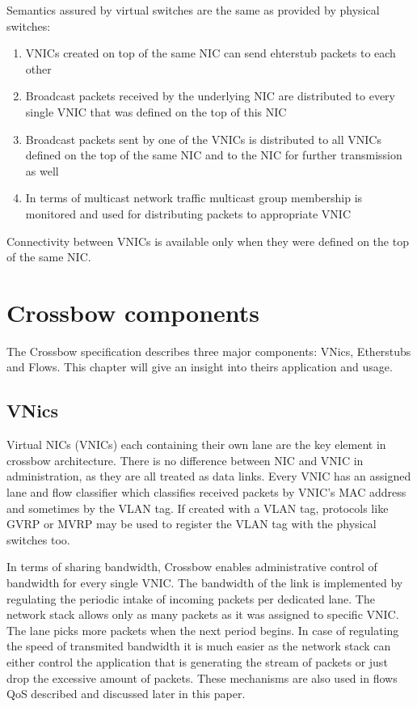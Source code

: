\documentclass[11pt]{book}
\begin{document}
			Semantics assured by virtual switches are the same as provided by physical switches: 
			\begin{enumerate}
				\item{VNICs created on top of the same NIC can send ehterstub packets to each other}
				\item{Broadcast packets received by the underlying NIC are distributed to every single VNIC that was defined on the top of this NIC}
				\item{Broadcast packets sent by one of the VNICs is distributed to all VNICs defined on the top of the same NIC and to the NIC for further transmission as well}
				\item{In terms of multicast network traffic multicast group membership is monitored and used for distributing packets to appropriate VNIC}
			\end{enumerate}

			Connectivity between VNICs is available only when they were defined on the top of the same NIC. 

		
	\section{Crossbow components}

                The Crossbow specification describes three major components: VNics, Etherstubs and Flows. This chapter will give an insight into theirs application and usage. 

		\subsection{VNics}
			Virtual NICs (VNICs) each containing their own lane are the key element in crossbow architecture. There is no
			difference between NIC and VNIC in administration, as they are all treated as data links. Every VNIC has an assigned
			lane and flow classifier which classifies received packets by VNIC's MAC address and sometimes by the VLAN tag.
			If created with a VLAN tag, protocols like GVRP or MVRP may be used to register the VLAN tag with the physical switches
			too.	

			In terms of sharing bandwidth, Crossbow enables administrative control of bandwidth for every single VNIC. The bandwidth of the link
			is implemented by regulating the periodic intake of incoming packets per dedicated lane. The network stack allows only as many packets as it was 
			assigned to specific VNIC. The lane picks more packets when the next period begins. In case of regulating the speed of transmited bandwidth it is much
			easier as the network stack can either control the application that is generating the stream of packets or just drop the excessive amount of packets.
			These mechanisms are also used in flows QoS described and discussed later in this paper.
\end{document}
